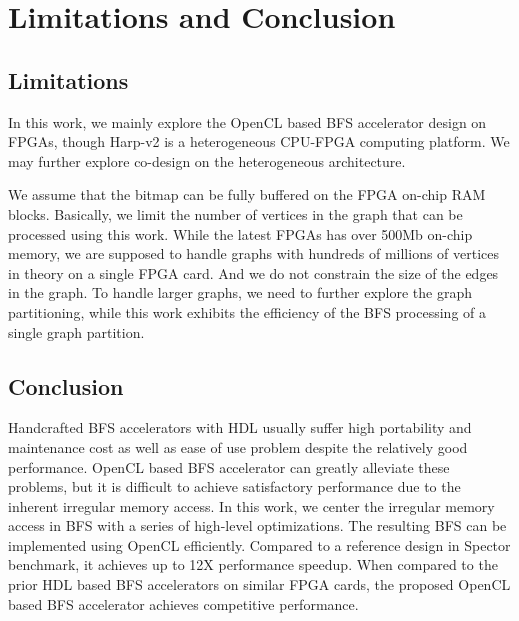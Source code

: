 \section{Limitations and Conclusion} \label{sec:conclusion}
\subsection{Limitations}
In this work, we mainly explore the OpenCL based BFS accelerator 
design on FPGAs, though Harp-v2 is a heterogeneous CPU-FPGA computing platform. 
We may further explore co-design on the heterogeneous architecture.

We assume that the bitmap can be fully buffered on the FPGA on-chip RAM blocks. 
Basically, we limit the number of vertices in the graph that 
can be processed using this work. While the latest FPGAs has over 
500Mb on-chip memory, we are supposed to handle graphs with hundreds 
of millions of vertices in theory on a single FPGA card. 
And we do not constrain the size of the edges in the graph. 
To handle larger graphs, we need to further explore 
the graph partitioning, while this work exhibits 
the efficiency of the BFS processing of a single graph partition.

\subsection{Conclusion}
Handcrafted BFS accelerators with HDL usually suffer high portability and maintenance cost 
as well as ease of use problem despite the relatively 
good performance. OpenCL based BFS accelerator can greatly alleviate these problems, but it is 
difficult to achieve satisfactory performance due to the inherent irregular memory access. 
In this work, we center the irregular memory access in BFS with  
a series of high-level optimizations. The resulting BFS can be implemented using OpenCL efficiently.
Compared to a reference design in Spector benchmark, it achieves up to 12X performance speedup.
When compared to the prior HDL based BFS accelerators on similar FPGA cards, 
the proposed OpenCL based BFS accelerator achieves competitive performance.


